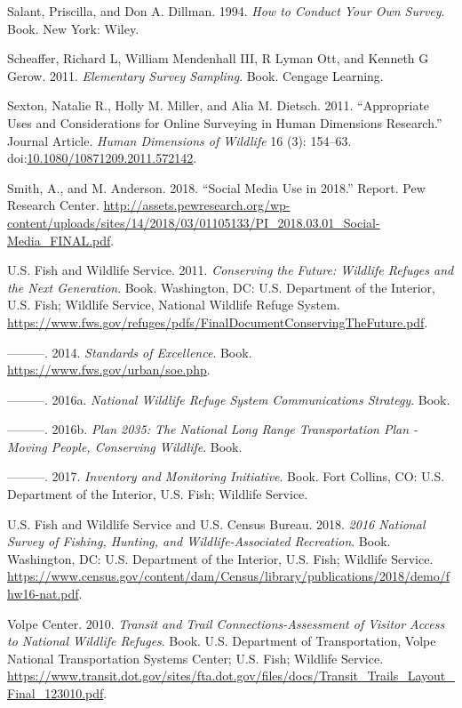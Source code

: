 \documentclass[]{book}
\begin{document}
\hypertarget{ref-salant1994}{}
Salant, Priscilla, and Don A. Dillman. 1994. \emph{How to Conduct Your
Own Survey}. Book. New York: Wiley.

\hypertarget{ref-scheaffer1996}{}
Scheaffer, Richard L, William Mendenhall III, R Lyman Ott, and Kenneth G
Gerow. 2011. \emph{Elementary Survey Sampling}. Book. Cengage Learning.

\hypertarget{ref-sexton2011}{}
Sexton, Natalie R., Holly M. Miller, and Alia M. Dietsch. 2011.
``Appropriate Uses and Considerations for Online Surveying in Human
Dimensions Research.'' Journal Article. \emph{Human Dimensions of
Wildlife} 16 (3): 154--63.
doi:\href{https://doi.org/10.1080/10871209.2011.572142}{10.1080/10871209.2011.572142}.

\hypertarget{ref-smith2018}{}
Smith, A., and M. Anderson. 2018. ``Social Media Use in 2018.'' Report.
Pew Research Center.
\url{http://assets.pewresearch.org/wp-content/uploads/sites/14/2018/03/01105133/PI_2018.03.01_Social-Media_FINAL.pdf}.

\hypertarget{ref-USFWS2011}{}
U.S. Fish and Wildlife Service. 2011. \emph{Conserving the Future:
Wildlife Refuges and the Next Generation}. Book. Washington, DC: U.S.
Department of the Interior, U.S. Fish; Wildlife Service, National
Wildlife Refuge System.
\url{https://www.fws.gov/refuges/pdfs/FinalDocumentConservingTheFuture.pdf}.

\hypertarget{ref-USFWS2014}{}
---------. 2014. \emph{Standards of Excellence}. Book.
\url{https://www.fws.gov/urban/soe.php}.

\hypertarget{ref-USFWS2016a}{}
---------. 2016a. \emph{National Wildlife Refuge System Communications
Strategy}. Book.

\hypertarget{ref-USFWS2016b}{}
---------. 2016b. \emph{Plan 2035: The National Long Range
Transportation Plan - Moving People, Conserving Wildlife}. Book.

\hypertarget{ref-USFWS2017}{}
---------. 2017. \emph{Inventory and Monitoring Initiative}. Book. Fort
Collins, CO: U.S. Department of the Interior, U.S. Fish; Wildlife
Service.

\hypertarget{ref-USFWS2018}{}
U.S. Fish and Wildlife Service and U.S. Census Bureau. 2018. \emph{2016
National Survey of Fishing, Hunting, and Wildlife-Associated
Recreation}. Book. Washington, DC: U.S. Department of the Interior, U.S.
Fish; Wildlife Service.
\url{https://www.census.gov/content/dam/Census/library/publications/2018/demo/fhw16-nat.pdf}.

\hypertarget{ref-volpe2010}{}
Volpe Center. 2010. \emph{Transit and Trail Connections-Assessment of
Visitor Access to National Wildlife Refuges}. Book. U.S. Department of
Transportation, Volpe National Transportation Systems Center; U.S. Fish;
Wildlife Service.
\url{https://www.transit.dot.gov/sites/fta.dot.gov/files/docs/Transit_Trails_Layout_Final_123010.pdf}.
\end{document}
